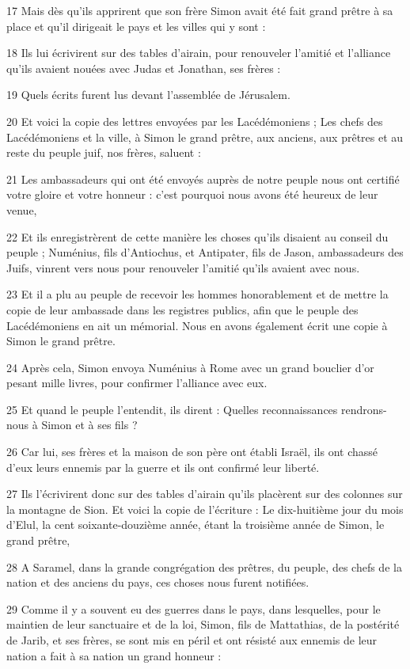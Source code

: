 \par 17 Mais dès qu'ils apprirent que son frère Simon avait été fait grand prêtre à sa place et qu'il dirigeait le pays et les villes qui y sont :
\par 18 Ils lui écrivirent sur des tables d'airain, pour renouveler l'amitié et l'alliance qu'ils avaient nouées avec Judas et Jonathan, ses frères :
\par 19 Quels écrits furent lus devant l'assemblée de Jérusalem.
\par 20 Et voici la copie des lettres envoyées par les Lacédémoniens ; Les chefs des Lacédémoniens et la ville, à Simon le grand prêtre, aux anciens, aux prêtres et au reste du peuple juif, nos frères, saluent :
\par 21 Les ambassadeurs qui ont été envoyés auprès de notre peuple nous ont certifié votre gloire et votre honneur : c'est pourquoi nous avons été heureux de leur venue,
\par 22 Et ils enregistrèrent de cette manière les choses qu'ils disaient au conseil du peuple ; Numénius, fils d'Antiochus, et Antipater, fils de Jason, ambassadeurs des Juifs, vinrent vers nous pour renouveler l'amitié qu'ils avaient avec nous.
\par 23 Et il a plu au peuple de recevoir les hommes honorablement et de mettre la copie de leur ambassade dans les registres publics, afin que le peuple des Lacédémoniens en ait un mémorial. Nous en avons également écrit une copie à Simon le grand prêtre.
\par 24 Après cela, Simon envoya Numénius à Rome avec un grand bouclier d'or pesant mille livres, pour confirmer l'alliance avec eux.
\par 25 Et quand le peuple l'entendit, ils dirent : Quelles reconnaissances rendrons-nous à Simon et à ses fils ?
\par 26 Car lui, ses frères et la maison de son père ont établi Israël, ils ont chassé d'eux leurs ennemis par la guerre et ils ont confirmé leur liberté.
\par 27 Ils l'écrivirent donc sur des tables d'airain qu'ils placèrent sur des colonnes sur la montagne de Sion. Et voici la copie de l'écriture : Le dix-huitième jour du mois d'Elul, la cent soixante-douzième année, étant la troisième année de Simon, le grand prêtre,
\par 28 A Saramel, dans la grande congrégation des prêtres, du peuple, des chefs de la nation et des anciens du pays, ces choses nous furent notifiées.
\par 29 Comme il y a souvent eu des guerres dans le pays, dans lesquelles, pour le maintien de leur sanctuaire et de la loi, Simon, fils de Mattathias, de la postérité de Jarib, et ses frères, se sont mis en péril et ont résisté aux ennemis de leur nation a fait à sa nation un grand honneur :
